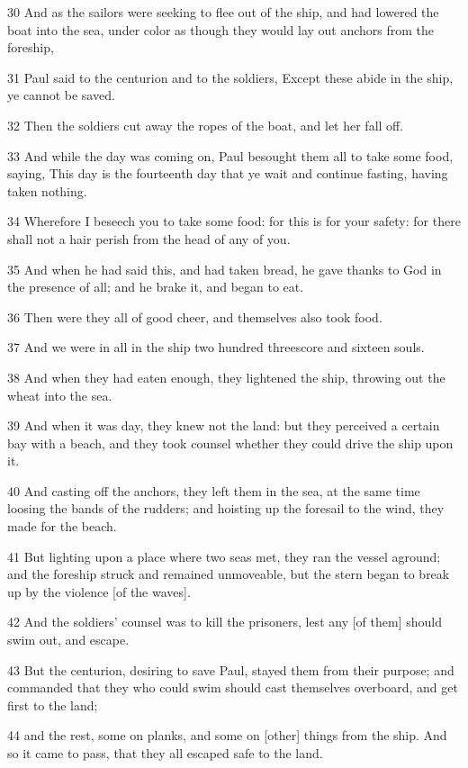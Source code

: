 \par 30 And as the sailors were seeking to flee out of the ship, and had lowered the boat into the sea, under color as though they would lay out anchors from the foreship,
\par 31 Paul said to the centurion and to the soldiers, Except these abide in the ship, ye cannot be saved.
\par 32 Then the soldiers cut away the ropes of the boat, and let her fall off.
\par 33 And while the day was coming on, Paul besought them all to take some food, saying, This day is the fourteenth day that ye wait and continue fasting, having taken nothing.
\par 34 Wherefore I beseech you to take some food: for this is for your safety: for there shall not a hair perish from the head of any of you.
\par 35 And when he had said this, and had taken bread, he gave thanks to God in the presence of all; and he brake it, and began to eat.
\par 36 Then were they all of good cheer, and themselves also took food.
\par 37 And we were in all in the ship two hundred threescore and sixteen souls.
\par 38 And when they had eaten enough, they lightened the ship, throwing out the wheat into the sea.
\par 39 And when it was day, they knew not the land: but they perceived a certain bay with a beach, and they took counsel whether they could drive the ship upon it.
\par 40 And casting off the anchors, they left them in the sea, at the same time loosing the bands of the rudders; and hoisting up the foresail to the wind, they made for the beach.
\par 41 But lighting upon a place where two seas met, they ran the vessel aground; and the foreship struck and remained unmoveable, but the stern began to break up by the violence [of the waves].
\par 42 And the soldiers' counsel was to kill the prisoners, lest any [of them] should swim out, and escape.
\par 43 But the centurion, desiring to save Paul, stayed them from their purpose; and commanded that they who could swim should cast themselves overboard, and get first to the land;
\par 44 and the rest, some on planks, and some on [other] things from the ship. And so it came to pass, that they all escaped safe to the land.

